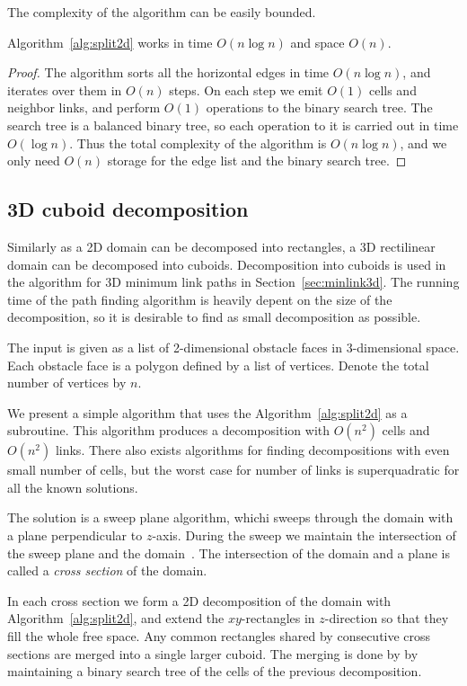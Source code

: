 \documentclass[english,gradu]{tktltiki2018}
\begin{document}
The complexity of the algorithm can be easily bounded.

\begin{lem}\label{lem:split2dtime}Algorithm~\ref{alg:split2d} works in time $O(n\log n)$ and space $O(n)$.\end{lem}
\begin{proof}
The algorithm sorts all the horizontal edges in time $O(n\log n)$, and iterates over them in $O(n)$ steps.
On each step we emit $O(1)$ cells and neighbor links, and perform $O(1)$ operations to the binary search tree.
The search tree is a balanced binary tree, so each operation to it is carried out in time $O(\log n)$.
Thus the total complexity of the algorithm is $O(n\log n)$, and we only need $O(n)$ storage for the edge list and the binary search tree.
\end{proof}

\subsection{3D cuboid decomposition}\label{sec:split3d}

Similarly as a 2D domain can be decomposed into rectangles, a 3D rectilinear domain can be decomposed into cuboids.
Decomposition into cuboids is used in the algorithm for 3D minimum link paths in Section~\ref{sec:minlink3d}.
The running time of the path finding algorithm is heavily depent on the size of the decomposition, so it is desirable to find as small decomposition as possible.

The input is given as a list of 2-dimensional obstacle faces in 3-dimensional space.
Each obstacle face is a polygon defined by a list of vertices.
Denote the total number of vertices by $n$.

We present a simple algorithm that uses the Algorithm~\ref{alg:split2d} as a subroutine.
This algorithm produces a decomposition with $O(n^2)$ cells and $O(n^2)$ links.
There also exists algorithms for finding decompositions with even small number of cells, but the worst case for number of links is superquadratic for all the known solutions.

The solution is a sweep plane algorithm, whichi sweeps through the domain with a plane perpendicular to $z$-axis.
During the sweep we maintain the intersection of the sweep plane and the domain~\fspace.
The intersection of the domain and a plane is called a \emph{cross section} of the domain.

In each cross section we form a 2D decomposition of the domain with Algorithm~\ref{alg:split2d}, and extend the $xy$-rectangles in $z$-direction so that they fill the whole free space.
Any common rectangles shared by consecutive cross sections are merged into a single larger cuboid.
The merging is done by by maintaining a binary search tree of the cells of the previous decomposition.
\end{document}
